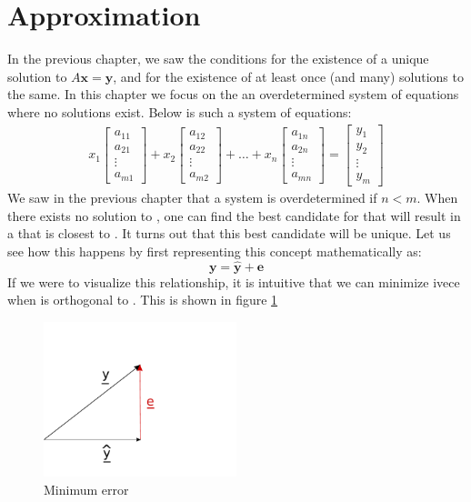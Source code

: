 \section{Approximation}
In the previous chapter, we saw the conditions for the existence of a unique solution to \(A\mathbf{x} = \mathbf{y}\), and for the existence of at least once (and many) solutions to the same. In this chapter we focus on the an overdetermined system of equations where no solutions exist. Below is such a system of equations:
	\begin{align*}
		x_1\begin{bmatrix} a_{11}\\ a_{21}\\ \vdots\\ a_{m1} \end{bmatrix} + x_2\begin{bmatrix} a_{12}\\ a_{22}\\ \vdots\\ a_{m2} \end{bmatrix} + \hdots + x_n\begin{bmatrix} a_{1n}\\ a_{2n}\\ \vdots\\ a_{mn} \end{bmatrix}
		= \begin{bmatrix} y_1\\ y_2\\ \vdots\\ y_m \end{bmatrix}
	\end{align*}
We saw in the previous chapter that a system is overdetermined if \(n<m\). When there exists no solution to , one can find the best candidate for  that will result in a  that is closest to . It turns out that this best candidate will be unique. Let us see how this happens by first representing this concept mathematically as:
	\[ \mathbf{y} = \hat{\mathbf{y}} + \mathbf{e} \]
If we were to visualize this relationship, it is intuitive that we can minimize ivec{e} when  is orthogonal to . This is shown in figure \ref{fig:orthogonal_error}
	\begin{figure}[h!]
	\centering
	\includegraphics[width=0.5\textwidth]{Linear_Algebra/orthogonal_error}
	\caption{Minimum error}
	\label{fig:orthogonal_error}
	\end{figure}	
